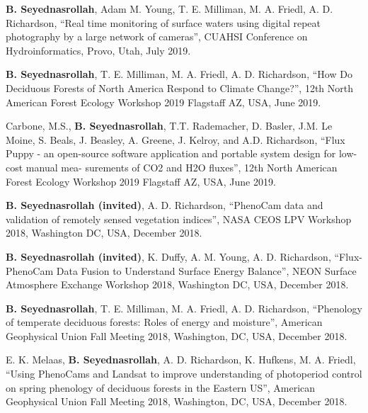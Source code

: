 \documentclass[10pt]{article}
\newenvironment{changemargin}[2]{%
  \begin{list}{}{%
 \setlength{\topsep}{0pt}%
 \setlength{\leftmargin}{#1}%
 \setlength{\rightmargin}{#2}%
 \setlength{\listparindent}{\parindent}%
 \setlength{\itemindent}{\parindent}%
 \setlength{\parsep}{\parskip}%
  }%
  \item[]}{\end{list}
}
\newenvironment{body} {
  \vspace*{-2pt}
  \begin{changemargin}{-0.5in}{-0.5in}
}
{\end{changemargin}
}
\begin{document}
\begin{body}
  \begin{etaremune}

    \item \textbf{B. Seyednasrollah}, Adam M. Young, T. E. Milliman, M. A. Friedl, A. D. Richardson, ``Real time monitoring of surface waters using digital repeat photography by a large network of cameras'', CUAHSI Conference on Hydroinformatics, Provo, Utah, July 2019.\\
    \medskip
    \item \textbf{B. Seyednasrollah}, T. E. Milliman, M. A. Friedl, A. D. Richardson, ``How Do Deciduous Forests of North America Respond to Climate Change?'', 12th North American Forest Ecology Workshop 2019 Flagstaff AZ, USA, June 2019.\\
    \medskip

\item Carbone, M.S., \textbf{B. Seyednasrollah}, T.T. Rademacher, D. Basler, J.M. Le Moine, S. Beals, J. Beasley, A. Greene, J. Kelroy, and A.D. Richardson, ``Flux Puppy - an open-source software application and portable system design for low-cost manual mea- surements of CO2 and H2O fluxes'', 12th North American Forest Ecology Workshop 2019 Flagstaff AZ, USA, June 2019.\\
    \medskip

    \item \textbf{B. Seyednasrollah (invited)}, A. D. Richardson, ``PhenoCam data and validation of remotely sensed vegetation indices'', NASA CEOS LPV Workshop 2018, Washington DC, USA, December 2018. \\
    \medskip

    \item \textbf{B. Seyednasrollah (invited)}, K. Duffy, A. M. Young, A. D. Richardson, ``Flux-PhenoCam Data Fusion to Understand Surface Energy Balance'', NEON Surface Atmosphere Exchange Workshop 2018, Washington DC, USA, December 2018. \\
    \medskip

    \item \textbf{B. Seyednasrollah}, T. E. Milliman, M. A. Friedl, A. D. Richardson, ``Phenology of temperate deciduous forests: Roles of energy and moisture'', American Geophysical Union Fall Meeting 2018, Washington, DC, USA, December 2018.\\
    \medskip

    \item E. K. Melaas, \textbf{B. Seyednasrollah}, A. D. Richardson, K. Hufkens, M. A. Friedl, ``Using PhenoCams and Landsat to improve understanding of photoperiod control on spring phenology of deciduous forests in the Eastern US'', American Geophysical Union Fall Meeting 2018, Washington, DC, USA, December 2018.\\
    \medskip


\end{etaremune}
\end{body}
\end{document}
